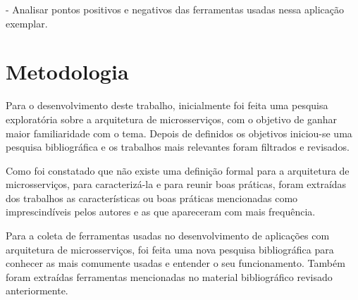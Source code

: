 - Analisar pontos positivos e negativos das ferramentas usadas nessa aplicação exemplar.

\section{Metodologia}

Para o desenvolvimento deste trabalho, inicialmente foi feita uma pesquisa exploratória sobre a arquitetura de microsserviços, com o objetivo de ganhar maior familiaridade com o tema. Depois de definidos os objetivos iniciou-se uma pesquisa bibliográfica e os trabalhos mais relevantes foram filtrados e revisados. 

Como foi constatado que não existe uma definição formal para a arquitetura de microsserviços, para caracterizá-la e para reunir boas práticas, foram extraídas dos trabalhos as características ou boas práticas mencionadas como imprescindíveis pelos autores e as que apareceram com mais frequência. 

Para a coleta de ferramentas usadas no desenvolvimento de aplicações com arquitetura de microsserviços, foi feita uma nova pesquisa bibliográfica para conhecer as mais comumente usadas e entender o seu funcionamento. Também foram extraídas ferramentas mencionadas no material bibliográfico revisado anteriormente.  






